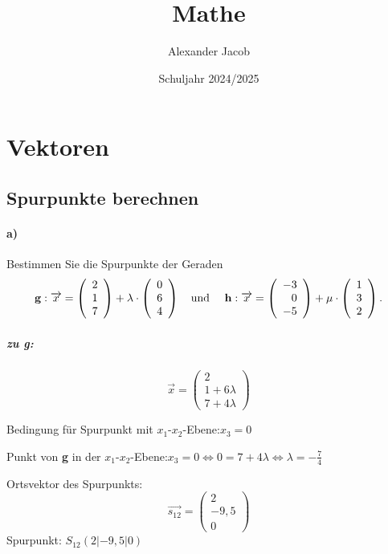 \documentclass{ajc}
\title{Mathe}
\author{Alexander Jacob}
\date{Schuljahr 2024/2025}
\numberwithin{equation}{subsection}
\begin{document}
	\section{Vektoren}
	\subsection{Spurpunkte berechnen}
	\paragraph{a)} Bestimmen Sie die Spurpunkte der Geraden
	\begin{equation}
		\mathbf{g}: \overrightarrow{x}=\left(\begin{array}{r} 2 \\ 1 \\ 7\end{array}\right) + \lambda \cdot \left(\begin{array}{r} 0 \\ 6 \\ 4\end{array}\right) \text{\quad und \quad} \mathbf{h}: \overrightarrow{x}=\left(\begin{array}{r} -3 \\ 0 \\ -5\end{array}\right) + \mu \cdot \left(\begin{array}{r} 1 \\ 3 \\ 2\end{array}\right). 
	\end{equation}
	
	\subparagraph{zu g:}
	\begin{equation}
		\overrightarrow{x}=\left(\begin{array}{r} 2 \\ 1 + 6\lambda \\ 7 + 4\lambda \end{array}\right)
	\end{equation}
	
	Bedingung für Spurpunkt mit $x_1\text{-}x_2$-Ebene:\quad $x_3 = 0$
	
	Punkt von \textbf{g} in der $x_1\text{-}x_2$-Ebene:\quad $x_3 = 0 \Leftrightarrow 0 = 7 + 4\lambda \Leftrightarrow \lambda = -\frac{7}{4}$
	
	Ortsvektor des Spurpunkts: 
	\begin{equation}
	\overrightarrow{s_\text{12}}=\left(\begin{array}{r} 2 \\ -9,5 \\ 0\end{array}\right)
	\end{equation}
	Spurpunkt: $S_\text{12}(2|-9,5|0)$
	
\end{document}
